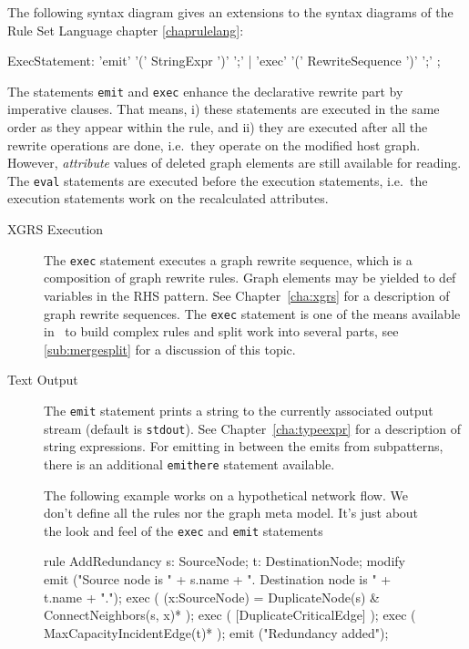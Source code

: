 The following syntax diagram gives an extensions to the syntax diagrams of the Rule Set Language chapter \ref{chaprulelang}:
\begin{rail}  
  ExecStatement: 'emit' '(' StringExpr ')' ';' | 'exec' '(' RewriteSequence ')' ';'
	;
\end{rail}
The statements \texttt{emit} and \texttt{exec} enhance the declarative rewrite part by imperative clauses.
That means, i) these statements are executed in the same order as they appear within the rule,
and ii) they are executed after all the rewrite operations are done, i.e.\ they operate on the modified host graph.
However, \emph{attribute} values of deleted graph elements are still available for reading.
The \texttt{eval} statements are executed before the execution statements, i.e.\ the execution statements work on the recalculated attributes.
\begin{description}
  \item[XGRS Execution] The \texttt{exec} statement executes a graph rewrite sequence, which is a composition of graph rewrite rules. Graph elements may be yielded to def variables in the RHS pattern. See Chapter~\ref{cha:xgrs} for a description of graph rewrite sequences. The \texttt{exec} statement is one of the means available in \GrG~to build complex rules and split work into several parts, see \ref{sub:mergesplit} for a discussion of this topic.
  \item[Text Output] The \texttt{emit} statement prints a string to the currently associated output stream (default is \texttt{stdout}). See Chapter~\ref{cha:typeexpr} for a description of string expressions.
  For emitting in between the emits from subpatterns, there is an additional \texttt{emithere} statement available.
\end{description}

\begin{figure}[htbp]
\begin{example}
	The following example works on a hypothetical network flow.
	We don't define all the rules nor the graph meta model.
	It's just about the look and feel of the \texttt{exec} and \texttt{emit} statements
	\begin{grgen}
rule AddRedundancy
{
  s: SourceNode;
  t: DestinationNode;	
  modify {
    emit ("Source node is " + s.name + ". Destination node is " + t.name + ".");
    exec ( (x:SourceNode) = DuplicateNode(s) & ConnectNeighbors(s, x)* );
    exec ( [DuplicateCriticalEdge] );
    exec ( MaxCapacityIncidentEdge(t)* );
    emit ("Redundancy added");
  }
}  
	\end{grgen}
\end{example}
\end{figure}

